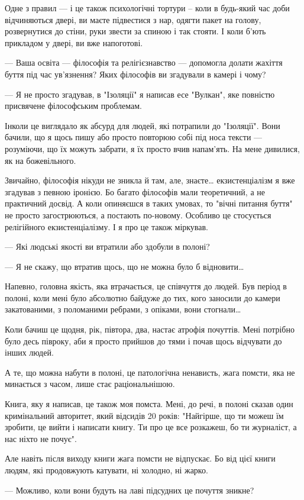 Одне з правил — і це також психологічні тортури – коли в будь-який час доби
відчиняються двері, ви маєте підвестися з нар, одягти пакет на голову,
розвернутися до стіни, руки звести за спиною і так стояти. І коли б’ють
прикладом у двері, ви вже напоготові.

— Ваша освіта — філософія та релігієзнавство — допомогла долати жахіття буття
під час ув’язнення? Яких філософів ви згадували в камері і чому?

— Я не просто згадував, в "Ізоляції" я написав есе "Вулкан", яке повністю
присвячене філософським проблемам.

Інколи це виглядало як абсурд для людей, які потрапили до "Ізоляції". Вони
бачили, що я щось пишу або просто повторюю собі під носа тексти — розуміючи, що
їх можуть забрати, я їх просто вчив напам’ять. На мене дивилися, як на
божевільного.

Звичайно, філософія нікуди не зникла й там, але, знаєте… екзистенціалізм я вже
згадував з певною іронією. Бо багато філософів мали теоретичний, а не
практичний досвід. А коли опиняєшся в таких умовах, то "вічні питання буття" не
просто загострюються, а постають по-новому. Особливо це стосується релігійного
екзистенціалізму. І я про це також міркував.

— Які людські якості ви втратили або здобули в полоні?

— Я не скажу, що втратив щось, що не можна було б відновити…

Напевно, головна якість, яка втрачається, це співчуття до людей. Був період в
полоні, коли мені було абсолютно байдуже до тих, кого заносили до камери
закатованими, з поломаними ребрами, з опіками, вони стогнали…

Коли бачиш це щодня, рік, півтора, два, настає атрофія почуттів. Мені потрібно
було десь півроку, аби я просто прийшов до тями і почав щось відчувати до інших
людей.

А те, що можна набути в полоні, це патологічна ненависть, жага помсти, яка не
минається з часом, лише стає раціональнішою.

Книга, яку я написав, це також моя помста. Мені, до речі, в полоні сказав один
кримінальний авторитет, який відсидів 20 років: "Найгірше, що ти можеш їм
зробити, це вийти і написати книгу. Ти про це все розкажеш, бо ти журналіст, а
нас ніхто не почує".

Але навіть після виходу книги жага помсти не відпускає. Бо від цієї книги
людям, які продовжують катувати, ні холодно, ні жарко.

— Можливо, коли вони будуть на лаві підсудних це почуття зникне?

